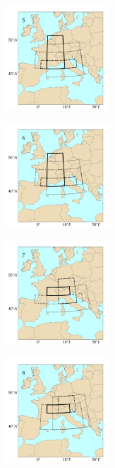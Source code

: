 \documentclass[twocol]{ametsoc}
\begin{document}
\begin{figure}[htb]
	\begin{subfigure}{.5\columnwidth}
		\centering
		\includegraphics[width=3.9cm]{figures/spatial_win_z4/Spatial_windows_5.png}
	\end{subfigure}%
	\begin{subfigure}{.5\columnwidth}
		\centering
		\includegraphics[width=3.9cm]{figures/spatial_win_z4/Spatial_windows_6.png}
	\end{subfigure}
	\begin{subfigure}{.5\columnwidth}
		\centering
		\includegraphics[width=3.9cm]{figures/spatial_win_z4/Spatial_windows_7.png}
	\end{subfigure}%
	\begin{subfigure}{.5\columnwidth}
		\centering
		\includegraphics[width=3.9cm]{figures/spatial_win_z4/Spatial_windows_8.png}
	\end{subfigure}
	\begin{subfigure}{.5\columnwidth}

\end{subfigure}
\end{figure}
\end{document}
